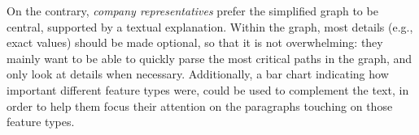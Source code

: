 On the contrary, \textit{company representatives} prefer the simplified graph to be central, supported by a textual explanation. Within the graph, most details (e.g., exact values) should be made optional, so that it is not overwhelming: they mainly want to be able to quickly parse the most critical paths in the graph, and only look at details when necessary. Additionally, a bar chart indicating how important different feature types were, could be used to complement the text, in order to help them focus their attention on the paragraphs touching on those feature types. 


